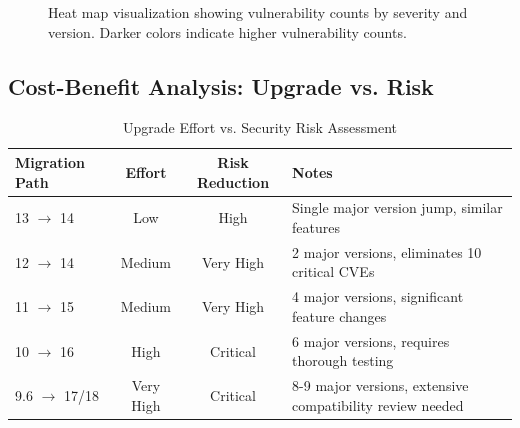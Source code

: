\documentclass[11pt, a4paper]{article}
\begin{document}
\begin{figure}[htbp]
\caption{Heat map visualization showing vulnerability counts by severity and version. Darker colors indicate higher vulnerability counts.}
\label{fig:heatmap}
\end{figure}


\subsection{Cost-Benefit Analysis: Upgrade vs. Risk}

\begin{table}[htbp]
\centering
\caption{Upgrade Effort vs. Security Risk Assessment}
\label{tab:cost-benefit}
\begin{tabular}{@{}lccp{6cm}@{}}
\toprule
\textbf{Migration Path} & \textbf{Effort} & \textbf{Risk Reduction} & \textbf{Notes} \\ \midrule
\rowcolor{lightgreen} 13 $\rightarrow$ 14 & Low & High & Single major version jump, similar features \\
\rowcolor{lightgreen} 12 $\rightarrow$ 14 & Medium & Very High & 2 major versions, eliminates 10 critical CVEs \\
\rowcolor{lightorange} 11 $\rightarrow$ 15 & Medium & Very High & 4 major versions, significant feature changes \\
\rowcolor{lightred} 10 $\rightarrow$ 16 & High & Critical & 6 major versions, requires thorough testing \\
\rowcolor{lightred} 9.6 $\rightarrow$ 17/18 & Very High & Critical & 8-9 major versions, extensive compatibility review needed \\
\bottomrule
\end{tabular}
\end{table}
\end{document}
